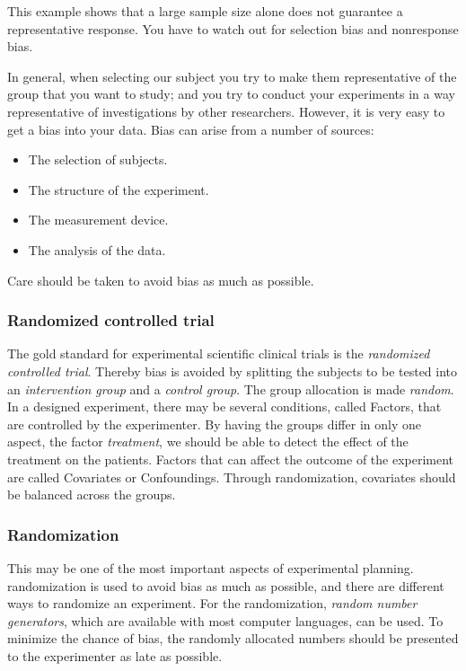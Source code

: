 This example shows that a large sample size alone does not guarantee a representative response. You have to watch out for selection bias and nonresponse bias.

In general, when selecting our subject you try to make them representative of the group that you want to study; and you try to conduct your experiments in a way representative of investigations by other researchers. However, it is very easy to get a bias into your data. Bias can arise from a number of sources:

\begin{itemize}
  \item The selection of subjects.
  \item The structure of the experiment.
  \item The measurement device.
  \item The analysis of the data.
\end{itemize}

Care should be taken to avoid bias as much as possible.

\subsubsection{Randomized controlled trial} 
The gold standard for experimental scientific clinical trials is the \emph{randomized controlled trial}. Thereby bias is avoided by splitting the subjects to be tested into an \emph{intervention group} and a \emph{control group}. The group allocation is made \emph{random}.
In a designed experiment, there may be several conditions, called Factors, that are controlled by the experimenter. By having the groups differ in only one aspect, the factor \emph{treatment}, we should be able to detect the effect of the treatment on the patients.
Factors that can affect the outcome of the experiment are called Covariates or Confoundings. Through randomization, covariates should be balanced across the groups.

\subsubsection{Randomization} 
This may be one of the most important aspects of experimental planning. \Gls{randomization} is used to avoid bias as much as possible, and there are different ways to randomize an experiment. For the randomization, \emph{random number generators}, which are available with most computer languages, can be used. To minimize the chance of bias, the randomly allocated numbers should be presented to the experimenter as late as possible.


